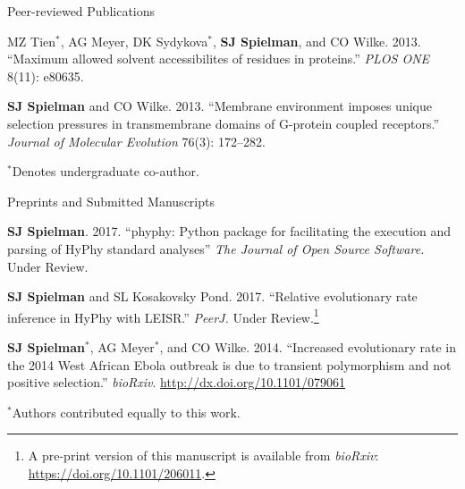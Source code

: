 \documentclass{resume} %
\begin{document}
\begin{rSection}{Peer-reviewed Publications}
\begin{etaremune}[leftmargin=1.5em]
\item MZ Tien$^\ast$, AG Meyer, DK Sydykova$^\ast$, \textbf{SJ Spielman}, and CO Wilke. 2013. ``Maximum allowed solvent accessibilites of residues in proteins.'' \emph{PLOS ONE} 8(11): e80635. \\


\item \textbf{SJ Spielman} and CO Wilke. 2013. ``Membrane environment imposes unique selection pressures in transmembrane domains of G-protein coupled receptors.'' \emph{Journal of Molecular Evolution} 76(3): 172--282. \\

\end{etaremune}

$^\ast$Denotes undergraduate co-author.
\end{rSection}



\vspace*{0.35cm}
\begin{rSection}{Preprints and Submitted Manuscripts}
\vspace*{0.25cm}

\begin{etaremune}[leftmargin=1.5em]


\item \textbf{SJ Spielman}. 2017. ``phyphy: Python package for facilitating the execution and parsing of HyPhy standard analyses'' \emph{The Journal of Open Source Software.} Under Review. \\


\item \textbf{SJ Spielman} and SL Kosakovsky Pond. 2017. ``Relative evolutionary rate inference in HyPhy with LEISR.'' \emph{PeerJ.} Under Review.\footnote{A pre-print version of this manuscript is available from \emph{bioRxiv}: \url{https://doi.org/10.1101/206011}.}\\


\item \textbf{SJ Spielman}$^\ast$, AG Meyer$^\ast$, and CO Wilke. 2014. ``Increased evolutionary rate in the 2014 West African Ebola outbreak is due to transient polymorphism and not positive selection.'' \emph{bioRxiv}. \url{http://dx.doi.org/10.1101/079061} \\

\end{etaremune}


$^\ast$Authors contributed equally to this work.
\end{rSection}
\end{document}
